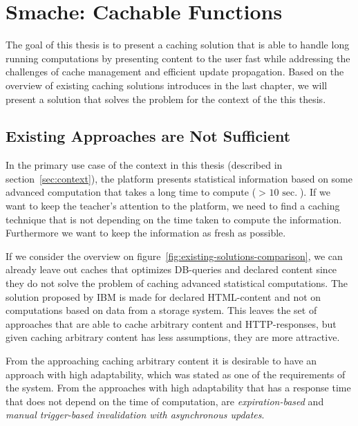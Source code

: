 \chapter{Smache: Cachable Functions}
\label{chapter:smache-cachable-functions}

The goal of this thesis is to present a caching solution that is able to handle long running computations by presenting content to the user fast while addressing the challenges of cache management and efficient update propagation. Based on the overview of existing caching solutions introduces in the last chapter, we will present a solution that solves the problem for the context of the this thesis.



\section{Existing Approaches are Not Sufficient}
\label{sec:existing-approaches-are-not-sufficient}

In the primary use case of the context in this thesis (described in section~\ref{sec:context}), the platform presents statistical information based on some advanced computation that takes a long time to compute ($>\text{ 10 sec.}$). If we want to keep the teacher's attention to the platform, we need to find a caching technique that is not depending on the time taken to compute the information. Furthermore we want to keep the information as fresh as possible.

If we consider the overview on figure~\ref{fig:existing-solutions-comparison}, we can already leave out caches that optimizes DB-queries and declared content since they do not solve the problem of caching advanced statistical computations. The solution proposed by IBM is made for declared HTML-content and not on computations based on data from a storage system. This leaves the set of approaches that are able to cache arbitrary content and HTTP-responses, but given caching arbitrary content has less assumptions, they are more attractive.

From the approaching caching arbitrary content it is desirable to have an approach with high adaptability, which was stated as one of the requirements of the system. From the approaches with high adaptability that has a response time that does not depend on the time of computation, are \emph{expiration-based} and \emph{manual trigger-based invalidation with asynchronous updates}.

